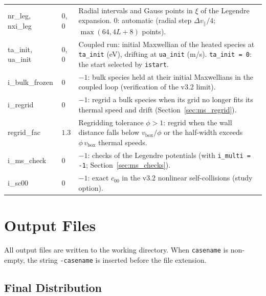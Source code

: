 \documentclass[11pt,a4paper]{article}
\newcommand{\vpa}{v_\parallel}
\begin{document}
\begin{longtable}{>{\ttfamily}p{3.2cm} p{1.5cm} p{9cm}}
nr\_leg, nxi\_leg & $0$, $0$ &
  Radial intervals and Gauss points in $\xi$ of the Legendre expansion.  $0$: automatic (radial
  step $\Delta\vpa/4$; $\max(64,4L+8)$ points). \\[4pt]

ta\_init, ua\_init & $0$, $0$ &
  Coupled run: initial Maxwellian of the heated species at \texttt{ta\_init} (eV), drifting at
  \texttt{ua\_init} (m/s).  \texttt{ta\_init = 0}: the start selected by \texttt{istart}. \\[4pt]

i\_bulk\_frozen & $0$ &
  $-1$: bulk species held at their initial Maxwellians in the coupled loop (verification of the
  v3.2 limit). \\[4pt]

i\_regrid & $0$ &
  $-1$: regrid a bulk species when its grid no longer fits its thermal speed and drift
  (Section~\ref{sec:ms_regrid}). \\[4pt]

regrid\_fac & $1.3$ &
  Regridding tolerance $\phi>1$: regrid when the wall distance falls below
  $v_\mathrm{box}/\phi$ or the half-width exceeds $\phi\,v_\mathrm{box}$ thermal speeds. \\[4pt]

i\_ms\_check & $0$ &
  $-1$: checks of the Legendre potentials (with \texttt{i\_multi = -1};
  Section~\ref{sec:ms_checks}). \\[4pt]

i\_sc00 & $0$ &
  $-1$: exact $c_{00}$ in the v3.2 nonlinear self-collisions (study option). \\[4pt]

\end{longtable}


\section{Output Files}

All output files are written to the working directory.  When \texttt{casename}
is non-empty, the string \texttt{-casename} is inserted before the file
extension.

\subsection{Final Distribution}
\end{document}
